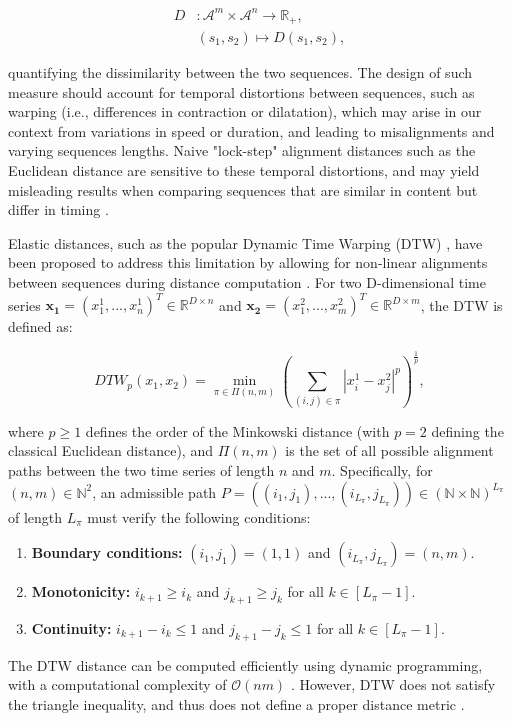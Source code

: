 \begin{chapterabstract}
    \begin{equation}
    \begin{aligned}
        D &: \mathcal{A}^m \times \mathcal{A}^n \to \mathbb{R}_+, \\
        & (s_1,s_2) \mapsto D(s_1,s_2),
    \end{aligned}
    \label{eq:distance}
    \end{equation}
    
    quantifying the dissimilarity between the two sequences. The design of such measure should account for temporal distortions between sequences, such as warping (i.e., differences in contraction or dilatation), which may arise in our context from variations in speed or duration, and leading to misalignments and varying sequences lengths. Naive "lock-step" alignment distances such as the Euclidean distance are sensitive to these temporal distortions, and may yield misleading results when comparing sequences that are similar in content but differ in timing \cite{Abanda2018}. 
    
    Elastic distances, such as the popular Dynamic Time Warping (DTW) \cite{Sakoe1971ADP}, have been proposed to address this limitation by allowing for non-linear alignments between sequences during distance computation \cite{combettes_these}. For two D-dimensional time series $\mathbf{x_1} = (x^1_{1}, ..., x^1_{n})^T \in \mathbb{R}^{D \times n}$ and $\mathbf{x_2} = (x^2_{1}, ..., x^2_{m})^T \in \mathbb{R}^{D \times m}$, the DTW is defined as:
    
    $$DTW_p(x_1, x_2) = \min_{\pi \in \Pi(n, m)} \left( \sum_{(i, j) \in \pi} |x^1_{i} - x^2_{ j} |^p \right)^{\tfrac{1}{p}},$$

    where $p \geq 1$ defines the order of the Minkowski distance (with $p=2$ defining the classical Euclidean distance), and $\Pi(n, m)$ is the set of all possible alignment paths between the two time series of length $n$ and $m$. Specifically, for $(n, m) \in \mathbb{N}^2$, an admissible path $P= ((i_1,j_1),...,(i_{L_\pi},j_{L_\pi})) \in (\mathbb{N} \times \mathbb{N} )^{L_\pi}$ of length $L_\pi$ must verify the following conditions:
    \begin{enumerate}
        \item \textbf{Boundary conditions:} $(i_1, j_1) = (1,1)$ and $(i_{L_\pi}, j_{L_\pi}) = (n,m)$.
        \item \textbf{Monotonicity:} $i_{k+1} \ge i_k$ and $j_{k+1} \ge j_k$ for all $k \in [L_\pi - 1]$.
        \item \textbf{Continuity:} $i_{k+1} - i_k \le 1$ and $j_{k+1} - j_k \le 1$ for all $k \in [L_\pi - 1]$.
    \end{enumerate}
    The DTW distance can be computed efficiently using dynamic programming, with a computational complexity of $\mathcal{O}(nm)$ \cite{Sakoe1971ADP}.
    However, DTW does not satisfy the triangle inequality, and thus does not define a proper distance metric \cite{combettes_these}. 
    

\end{chapterabstract}

